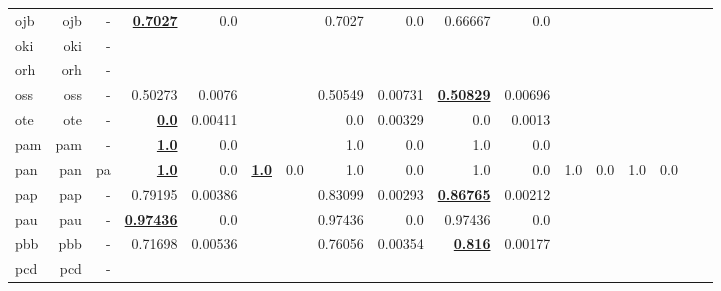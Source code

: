 \documentclass[11pt]{article}
\begin{document}
\begin{table*}[h]
{\begin{tabular}{lrrrrrrrrrrrrrrrr}
ojb         & ojb         & -         & \textbf{\underline{0.7027}}         & 0.0         &          &          & 0.7027         & 0.0         & 0.66667         & 0.0         &          &          &          &          \\
oki         & oki         & -         &          &          &          &          &          &          &          &          &          &          &          &          \\
orh         & orh         & -         &          &          &          &          &          &          &          &          &          &          &          &          \\
oss         & oss         & -         & 0.50273         & 0.0076         &          &          & 0.50549         & 0.00731         & \textbf{\underline{0.50829}}         & 0.00696         &          &          &          &          \\
ote         & ote         & -         & \textbf{\underline{0.0}}         & 0.00411         &          &          & 0.0         & 0.00329         & 0.0         & 0.0013         &          &          &          &          \\
pam         & pam         & -         & \textbf{\underline{1.0}}         & 0.0         &          &          & 1.0         & 0.0         & 1.0         & 0.0         &          &          &          &          \\
pan         & pan         & pa         & \textbf{\underline{1.0}}         & 0.0         & \textbf{\underline{1.0}}         & 0.0         & 1.0         & 0.0         & 1.0         & 0.0         & 1.0         & 0.0         & 1.0         & 0.0         \\
pap         & pap         & -         & 0.79195         & 0.00386         &          &          & 0.83099         & 0.00293         & \textbf{\underline{0.86765}}         & 0.00212         &          &          &          &          \\
pau         & pau         & -         & \textbf{\underline{0.97436}}         & 0.0         &          &          & 0.97436         & 0.0         & 0.97436         & 0.0         &          &          &          &          \\
pbb         & pbb         & -         & 0.71698         & 0.00536         &          &          & 0.76056         & 0.00354         & \textbf{\underline{0.816}}         & 0.00177         &          &          &          &          \\
pcd         & pcd         & -         &          &          &          &          &          &          &          &          &          &          &          &          \\

\end{tabular}}
\end{table*}
\end{document}
